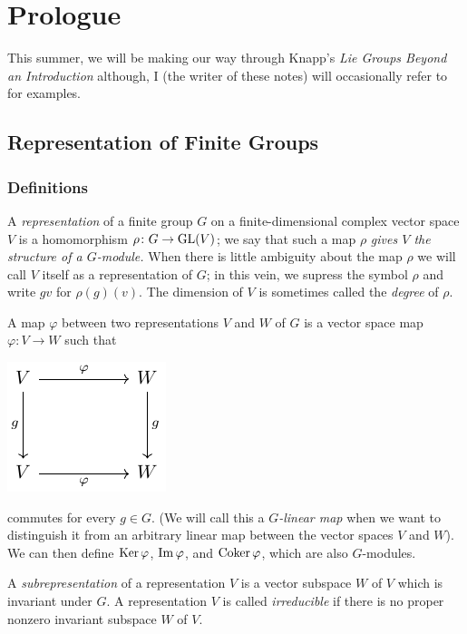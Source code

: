\chapter{Prologue}
This summer, we will be making our way through Knapp's \emph{Lie Groups
  Beyond an Introduction} \cite{knapp} although, I (the writer of these
notes) will occasionally refer to \cite{hall} for examples.

\section{Representation of Finite Groups}
\subsection{Definitions}
A \emph{representation} of a finite group $G$ on a finite-dimensional
complex vector space $V$ is a homomorphism $\rho\colon G\to\mathrm{GL}(V)$; we say
that such a map $\rho$ \emph{gives $V$ the structure of a $G$-module.} When
there is little ambiguity about the map $\rho$ we will call $V$ itself as a
representation of $G$; in this vein, we supress the symbol $\rho$ and write
$gv$ for $\rho(g)(v)$. The dimension of $V$ is sometimes called the
\emph{degree} of $\rho$.

A map $\varphi$ between two representations $V$ and $W$ of $G$ is a vector
space map $\varphi\colon V\to W$ such that
\begin{center}
\includegraphics{figures/week-1-diag-1}
\end{center}
commutes for every $g\in G$. (We will call this a \emph{$G$-linear map}
when we want to distinguish it from an arbitrary linear map between the
vector spaces $V$ and $W$). We can then define $\operatorname{Ker}\varphi$,
$\operatorname{Im}\varphi$, and $\operatorname{Coker}\varphi$, which are also $G$-modules.

A \emph{subrepresentation} of a representation $V$ is a vector subspace $W$
of $V$ which is invariant under $G$. A representation $V$ is called
\emph{irreducible} if there is no proper nonzero invariant subspace $W$ of
$V$.

